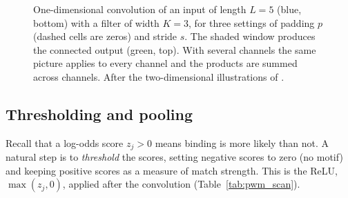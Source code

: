 \begin{figure}[t]
  \centering
  \caption{One-dimensional convolution of an input of length $L=5$ (blue, bottom) with a filter of width $K=3$, for three settings of padding $p$ (dashed cells are zeros) and stride $s$. The shaded window produces the connected output (green, top). With several channels the same picture applies to every channel and the products are summed across channels. After the two-dimensional illustrations of \citet{dumoulin2016}.}
  \label{fig:conv_arith}
\end{figure}

\subsection{Thresholding and pooling}

Recall that a log-odds score $z_j>0$ means binding is more likely than not. A natural step is to \emph{threshold} the scores, setting negative scores to zero (no motif) and keeping positive scores as a measure of match strength. This is the ReLU, $\max(z_j,0)$, applied after the convolution (Table~\ref{tab:pwm_scan}).

